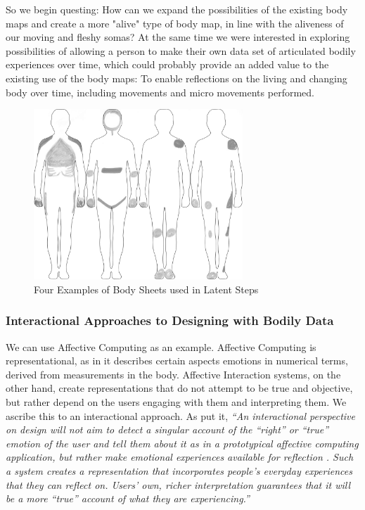 So we begin questing: How can we expand the possibilities of the existing body maps and create a more "alive" type of body map, in line with the aliveness of our moving and fleshy somas? At the same time we were interested in exploring possibilities of allowing a person to make their own data set of articulated bodily experiences over time, which could probably provide an added value to the existing use of the body maps: To enable reflections on the living and changing body over time, including movements and micro movements performed.


\begin{figure}[ht]
    \centering
    \includegraphics[width=0.70\textwidth]{Chapters/Figures/modi_dis/drawing_samples2.png}
    \caption{Four Examples of Body Sheets used in Latent Steps}
    \label{fig:draw_samples}
\end{figure}

\subsubsection{Interactional Approaches to Designing with Bodily Data}

We can use Affective Computing as an example. Affective Computing is representational, as in it describes certain aspects emotions in numerical terms, derived from measurements in the body. Affective Interaction systems, on the other hand, create representations that do not attempt to be true and objective, but rather depend on the users engaging with them and interpreting them. We ascribe this to an interactional approach. As \citeauthor{hook_affective_2009} put it, \textit{“An interactional perspective on design will not aim to detect a singular account of the “right” or “true” emotion of the user and tell them about it as in a prototypical affective computing application, but rather make emotional experiences available for reflection \cite{hook_affective_2009}. Such a system creates a representation that incorporates people’s everyday experiences that they can reflect on. Users’ own, richer interpretation guarantees that it will be a more “true” account of what they are experiencing.”}

